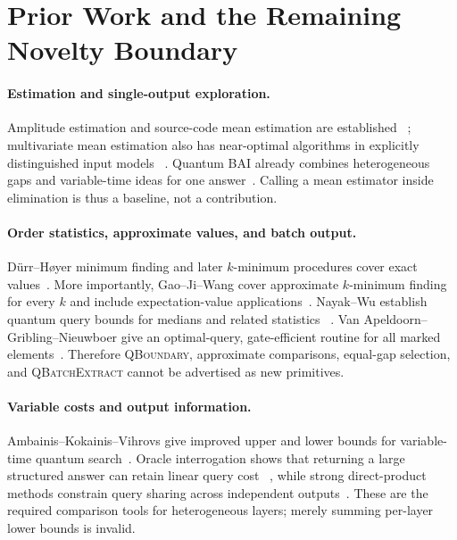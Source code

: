 \documentclass[10pt]{article}
\theoremstyle{definition}
\begin{document}
\section{Prior Work and the Remaining Novelty Boundary}

\paragraph{Estimation and single-output exploration.}
Amplitude estimation and source-code mean estimation are established
~\cite{brassard2002amplitude,kothari2023mean}; multivariate mean estimation also
has near-optimal algorithms in explicitly distinguished input models
~\cite{cornelissen2022multivariate}.  Quantum BAI already combines heterogeneous
gaps and variable-time ideas for one answer~\cite{wang2021quantum}.  Calling a
mean estimator inside elimination is thus a baseline, not a contribution.

\paragraph{Order statistics, approximate values, and batch output.}
D{\"u}rr--H{\o}yer minimum finding and later $k$-minimum procedures cover exact
values~\cite{durr1996minimum,miyamoto2019kminima}.  More importantly,
Gao--Ji--Wang cover approximate $k$-minimum finding for every $k$ and include
expectation-value applications~\cite{gao2025approxkmin}.  Nayak--Wu establish
quantum query bounds for medians and related statistics
~\cite{nayak1999median}.  Van Apeldoorn--Gribling--Nieuwboer give an optimal-query,
gate-efficient routine for all marked elements~\cite{vanapeldoorn2024marked}.
Therefore \textsc{QBoundary}, approximate comparisons, equal-gap selection, and
\textsc{QBatchExtract} cannot be advertised as new primitives.

\paragraph{Variable costs and output information.}
Ambainis--Kokainis--Vihrovs give improved upper and lower bounds for variable-time
quantum search~\cite{ambainis2023variable}.  Oracle interrogation shows that
returning a large structured answer can retain linear query cost
~\cite{vandam1998interrogation}, while strong direct-product methods constrain
query sharing across independent outputs~\cite{lee2012directproduct}.  These are
the required comparison tools for heterogeneous layers; merely summing
per-layer lower bounds is invalid.
\end{document}
